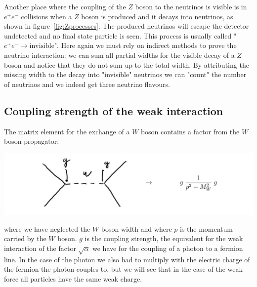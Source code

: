 \documentclass[12pt]{article}
\begin{document}
Another place where the coupling of the $Z$ boson to the neutrinos is visible is in $e^+e^-$ collisions when a $Z$ boson is produced and it decays into neutrinos, as shown in figure~\ref{fig:Zprocesses}. The produced neutrinos will escape the detector undetected and no final state particle is seen. This process is usually called "$e^+e^-\rightarrow \mbox{invisible}$". Here again we must rely on indirect methods to prove the neutrino interaction: we can sum all partial widths for the visible decay of a $Z$ boson and notice that they do not sum up to the total width. By attributing the missing width to the decay into "invisible" neutrinos we can "count" the number of neutrinos and we indeed get three neutrino flavours.
%
\subsection{Coupling strength of the weak interaction}
%
%
The matrix element for the exchange of a $W$ boson contains a factor from the $W$ boson propagator:
\begin{center}
\includegraphics[scale=0.2]{images/WpropWithEq.png}
\end{center}
where we have neglected the $W$ boson width and where $p$ is the momentum carried by the $W$ boson. $g$ is the coupling strength, the equivalent for the weak interaction of the factor $\sqrt{\alpha}$ we have for the coupling of a photon to a fermion line. In the case of the photon we also had to multiply with the electric charge of the fermion the photon couples to, but we will see that in the case of the weak force all particles have the same weak charge. 
\end{document}
